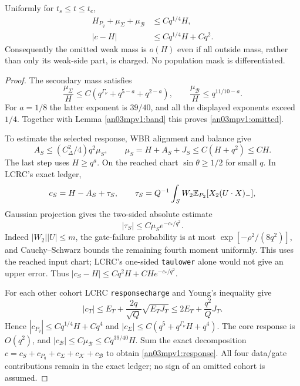 \documentclass[11pt]{article}
\numberwithin{equation}{section}
\theoremstyle{remark}\newtheorem{remark}[theorem]{Remark}
\newcommand{\KK}{\mathcal K}\newcommand{\BB}{\mathcal B}
\begin{document}
\begin{proposition}
\label{an03mpv1:accounting}
Uniformly for $t_s\le t\le t_e$,
\begin{align}
 H_{P_q}+\mu_\Sigma+\mu_\BB&\le Cq^{1/4}H,
 \label{an03mpv1:omitted}\\
 |c-H|&\le Cq^{1/4}H+Cq^2.
 \label{an03mpv1:response}
\end{align}
Consequently the omitted weak mass is $o(H)$ even if all outside
mass, rather than only its weak-side part, is charged. No population
mask is differentiated.
\end{proposition}
\begin{proof}
The secondary mass satisfies
\[
 \frac{\mu_\Sigma}{H}\le C\left(q^{\Gamma_\nu}
       +q^{5-a}+q^{2-a}\right),\qquad
 \frac{\mu_\BB}{H}\le q^{11/10-a}.
\]
For $a=1/8$ the latter exponent is $39/40$, and all the displayed
exponents exceed $1/4$. Together with Lemma \ref{an03mpv1:band}
this proves \eqref{an03mpv1:omitted}.

To estimate the selected response, WBR alignment and balance give
\begin{equation}
 A_S\le(C_\Delta^2/4)q^2\mu_S,\qquad
 \mu_S=H+A_S+J_S\le C(H+q^2)\le CH.
 \label{an03mpv1:earlymass}
\end{equation}
The last step uses $H\ge q^a$. On the reached chart
$\sin\theta\ge1/2$ for small $q$. In LCRC's exact ledger,
\[
 c_S=H-A_S+\tau_S,\qquad
 \tau_S=Q^{-1}\int_S W_2\mathbb E_{P_2}[X_2(U\cdot X)_-],
\]
Gaussian projection gives the two-sided absolute estimate
\begin{equation}
 |\tau_S|\le C\mu_S e^{-c_*/q^2}.
 \label{an03mpv1:tail}
\end{equation}
Indeed $|W_2||U|\le m$, the gate-failure probability is at most
$\exp[-\rho^2/(8q^2)]$, and Cauchy--Schwarz bounds the remaining
fourth moment uniformly. This uses the reached input chart; LCRC's
one-sided \texttt{taulower} alone would not give an upper error.
Thus $|c_S-H|\le Cq^2H+CH e^{-c_*/q^2}$.

For each other cohort LCRC \texttt{responsecharge} and Young's
inequality give
\[
 |c_T|\le E_T+\frac{2q}{\sqrt Q}\sqrt{E_TJ_T}
          \le2E_T+\frac{q^2}{Q}J_T.
\]
Hence $|c_{P_q}|\le Cq^{1/4}H+Cq^4$ and
$|c_\Sigma|\le C(q^5+q^{\Gamma_\nu}H+q^4)$.
The core response is $O(q^2)$, and
$|c_\BB|\le C\mu_\BB\le Cq^{39/40}H$.
Sum the exact decomposition
$c=c_S+c_{P_q}+c_\Sigma+c_\KK+c_\BB$ to obtain
\eqref{an03mpv1:response}. All four data/gate contributions remain
in the exact ledger; no sign of an omitted cohort is assumed.
\end{proof}
\end{document}
